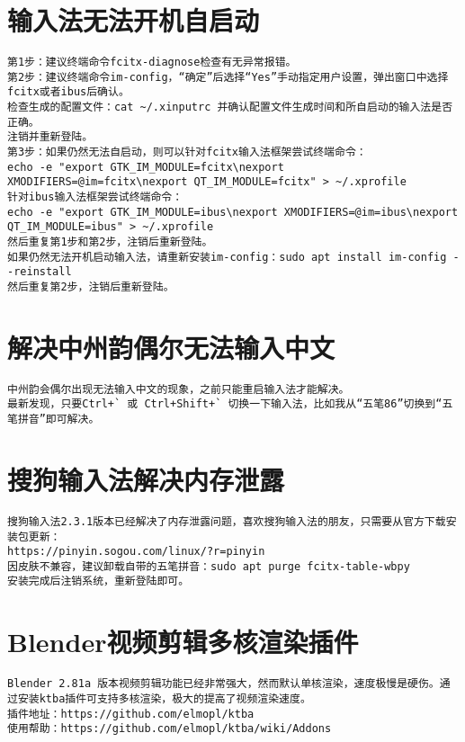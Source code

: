 \documentclass[a4paper,fontset=fandol,zihao=-4,linespread=1.2]{ctexbook}
\begin{document}
\section{输入法无法开机自启动}
\begin{lstlisting}
第1步：建议终端命令fcitx-diagnose检查有无异常报错。
第2步：建议终端命令im-config，“确定”后选择“Yes”手动指定用户设置，弹出窗口中选择fcitx或者ibus后确认。
检查生成的配置文件：cat ~/.xinputrc 并确认配置文件生成时间和所自启动的输入法是否正确。
注销并重新登陆。
第3步：如果仍然无法自启动，则可以针对fcitx输入法框架尝试终端命令：
echo -e "export GTK_IM_MODULE=fcitx\nexport XMODIFIERS=@im=fcitx\nexport QT_IM_MODULE=fcitx" > ~/.xprofile
针对ibus输入法框架尝试终端命令：
echo -e "export GTK_IM_MODULE=ibus\nexport XMODIFIERS=@im=ibus\nexport QT_IM_MODULE=ibus" > ~/.xprofile
然后重复第1步和第2步，注销后重新登陆。
如果仍然无法开机启动输入法，请重新安装im-config：sudo apt install im-config --reinstall
然后重复第2步，注销后重新登陆。
\end{lstlisting}

\section{解决中州韵偶尔无法输入中文}
\begin{lstlisting}
中州韵会偶尔出现无法输入中文的现象，之前只能重启输入法才能解决。
最新发现，只要Ctrl+` 或 Ctrl+Shift+` 切换一下输入法，比如我从“五笔86”切换到“五笔拼音”即可解决。
\end{lstlisting}

\section{搜狗输入法解决内存泄露}
\begin{lstlisting}
搜狗输入法2.3.1版本已经解决了内存泄露问题，喜欢搜狗输入法的朋友，只需要从官方下载安装包更新：
https://pinyin.sogou.com/linux/?r=pinyin
因皮肤不兼容，建议卸载自带的五笔拼音：sudo apt purge fcitx-table-wbpy
安装完成后注销系统，重新登陆即可。
\end{lstlisting}

\section{Blender视频剪辑多核渲染插件}
\begin{lstlisting}
Blender 2.81a 版本视频剪辑功能已经非常强大，然而默认单核渲染，速度极慢是硬伤。通过安装ktba插件可支持多核渲染，极大的提高了视频渲染速度。
插件地址：https://github.com/elmopl/ktba
使用帮助：https://github.com/elmopl/ktba/wiki/Addons
\end{lstlisting}
\end{document}

